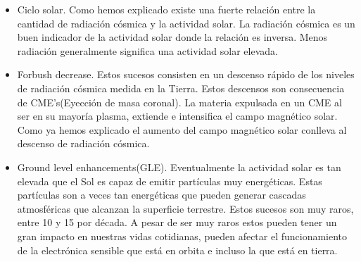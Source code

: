 	\begin{itemize}
		\item	Ciclo solar. Como hemos explicado existe una fuerte relación entre la cantidad de radiación cósmica y la actividad solar. La
			radiación cósmica es un buen indicador de la actividad solar donde la relación es inversa. Menos radiación generalmente
			significa una actividad solar elevada.
		\item	Forbush decrease\cite{Forbush1938}. Estos sucesos consisten en un descenso rápido de los niveles de radiación cósmica medida
			en la Tierra. Estos descensos son consecuencia de CME's(Eyección de masa coronal). La materia expulsada en un CME al ser en su
			mayoría plasma, extiende e intensifica el campo magnético solar. Como ya hemos explicado el aumento del campo magnético solar
			conlleva al descenso de radiación cósmica.
		\item	Ground level enhancements(GLE). Eventualmente la actividad solar es tan elevada que el Sol es capaz de emitir partículas muy
			energéticas. Estas partículas son a veces tan energéticas que pueden generar cascadas atmosféricas que alcanzan la superficie
			terrestre. Estos sucesos son muy raros, entre 10 y 15 por década. A pesar de ser muy raros estos pueden tener un gran impacto
			en nuestras vidas cotidianas, pueden afectar el funcionamiento de la electrónica sensible que está en orbita e incluso la que
			está en tierra.   
	\end{itemize}

